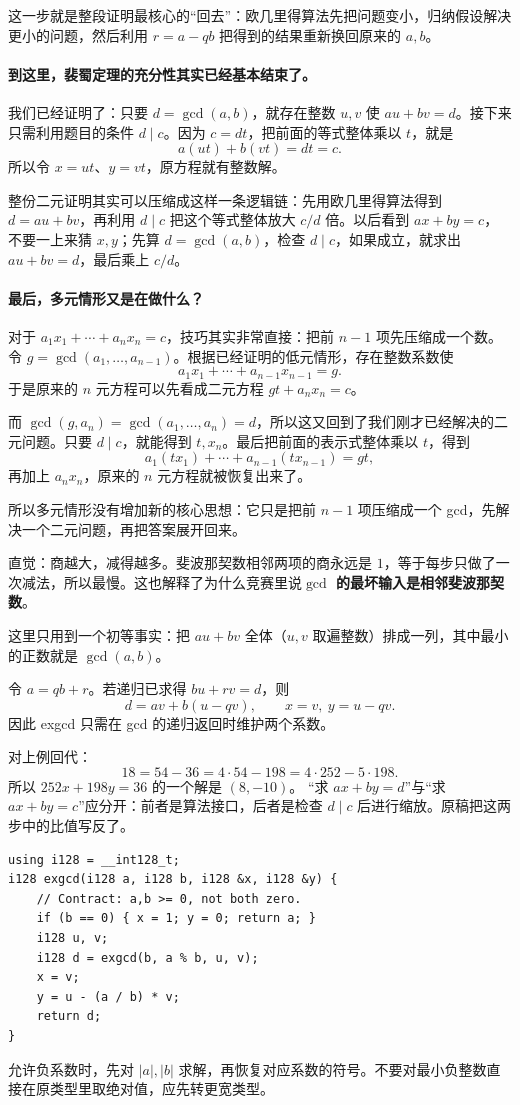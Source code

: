 \documentclass[UTF8,a4paper,11pt,twoside,openright,fontset=fandol]{ctexbook}
\theoremstyle{definition}
\begin{document}
\begin{pitfall}[思考：这份证明为什么要这样走？]
这一步就是整段证明最核心的“回去”：欧几里得算法先把问题变小，归纳假设解决更小的问题，然后利用 $r=a-qb$ 把得到的结果重新换回原来的 $a,b$。

\paragraph{到这里，裴蜀定理的充分性其实已经基本结束了。}
我们已经证明了：只要 $d=\gcd(a,b)$，就存在整数 $u,v$ 使 $au+bv=d$。接下来只需利用题目的条件 $d\mid c$。因为 $c=dt$，把前面的等式整体乘以 $t$，就是
\[
 a(ut)+b(vt)=dt=c.
\]
所以令 $x=ut$、$y=vt$，原方程就有整数解。

整份二元证明其实可以压缩成这样一条逻辑链：先用欧几里得算法得到 $d=au+bv$，再利用 $d\mid c$ 把这个等式整体放大 $c/d$ 倍。以后看到 $ax+by=c$，不要一上来猜 $x,y$；先算 $d=\gcd(a,b)$，检查 $d\mid c$，如果成立，就求出 $au+bv=d$，最后乘上 $c/d$。

\paragraph{最后，多元情形又是在做什么？}
对于 $a_1x_1+\cdots+a_nx_n=c$，技巧其实非常直接：把前 $n-1$ 项先压缩成一个数。令 $g=\gcd(a_1,\ldots,a_{n-1})$。根据已经证明的低元情形，存在整数系数使
\[
 a_1x_1+\cdots+a_{n-1}x_{n-1}=g.
\]
于是原来的 $n$ 元方程可以先看成二元方程 $gt+a_nx_n=c$。

而 $\gcd(g,a_n)=\gcd(a_1,\ldots,a_n)=d$，所以这又回到了我们刚才已经解决的二元问题。只要 $d\mid c$，就能得到 $t,x_n$。最后把前面的表示式整体乘以 $t$，得到
\[
 a_1(tx_1)+\cdots+a_{n-1}(tx_{n-1})=gt,
\]
再加上 $a_nx_n$，原来的 $n$ 元方程就被恢复出来了。

所以多元情形没有增加新的核心思想：它只是把前 $n-1$ 项压缩成一个 gcd，先解决一个二元问题，再把答案展开回来。
\end{pitfall}

\begin{tip}
直觉：商越大，减得越多。斐波那契数相邻两项的商永远是 $1$，等于每步只做了一次减法，所以最慢。这也解释了为什么竞赛里说\textbf{$\gcd$ 的最坏输入是相邻斐波那契数}。
\end{tip}

这里只用到一个初等事实：把 $au+bv$ 全体（$u,v$ 取遍整数）排成一列，其中最小的正数就是 $\gcd(a,b)$。

令 $a=qb+r$。若递归已求得 $bu+rv=d$，则
\[
 d=av+b(u-qv),\qquad x=v,\ y=u-qv.
\]
因此 exgcd 只需在 gcd 的递归返回时维护两个系数。


对上例回代：
\[
18=54-36=4\cdot54-198=4\cdot252-5\cdot198.
\]
所以 $252x+198y=36$ 的一个解是 $(8,-10)$。
“求 $ax+by=d$”与“求 $ax+by=c$”应分开：前者是算法接口，后者是检查 $d\mid c$ 后进行缩放。原稿把这两步中的比值写反了。
\begin{lstlisting}
using i128 = __int128_t;
i128 exgcd(i128 a, i128 b, i128 &x, i128 &y) {
    // Contract: a,b >= 0, not both zero.
    if (b == 0) { x = 1; y = 0; return a; }
    i128 u, v;
    i128 d = exgcd(b, a % b, u, v);
    x = v;
    y = u - (a / b) * v;
    return d;
}
\end{lstlisting}
允许负系数时，先对 $|a|,|b|$ 求解，再恢复对应系数的符号。不要对最小负整数直接在原类型里取绝对值，应先转更宽类型。
\end{document}
